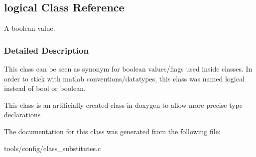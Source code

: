 \hypertarget{classlogical}{}\subsection{logical Class Reference}
\label{classlogical}


A boolean value.  




\subsubsection{Detailed Description}
This class can be seen as synonym for boolean values/flags used inside classes. In order to stick with matlab conventions/datatypes, this class was named logical instead of bool or boolean.

This class is an artificially created class in doxygen to allow more precise type declarations 

The documentation for this class was generated from the following file\+:\begin{DoxyCompactItemize}
\item 
tools/config/class\+\_\+substitutes.\+c\end{DoxyCompactItemize}
